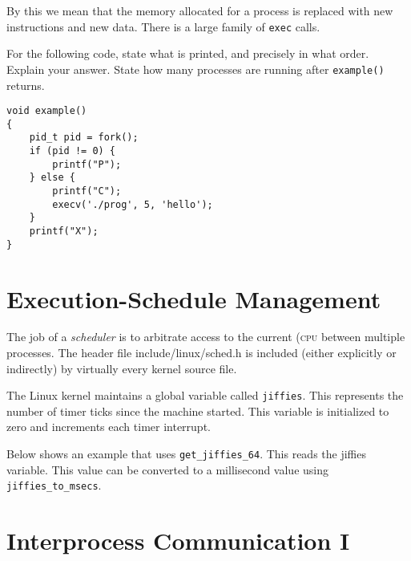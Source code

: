By this we mean that the memory allocated for a process is replaced with new 
instructions and new data. There is a large family of \lstinline{exec} calls.

\frmrule

\begin{example}
For the following code, state what is printed, and precisely in what order.
Explain your answer. State how many processes are running 
after \lstinline{example()} returns.

\begin{lstlisting}
void example()
{
	pid_t pid = fork();
	if (pid != 0) {
		printf("P");
	} else {
		printf("C");
		execv('./prog', 5, 'hello');
	}       
	printf("X");
}
\end{lstlisting}
\end{example}



\section{Execution-Schedule Management}

The job of a \textit{scheduler} is to arbitrate access to the 
current (\textsc{cpu} between multiple processes.
The header file include/linux/sched.h is included (either explicitly or indirectly) by
virtually every kernel source file.

The Linux kernel maintains a global variable called \lstinline{jiffies}. 
This represents the number of timer ticks since the machine started. 
This variable is initialized to zero and increments each timer interrupt.

Below shows an example that uses \lstinline{get_jiffies_64}. This reads the jiffies 
variable. This value can be converted to a millisecond value using 
\lstinline{jiffies_to_msecs}.







\section{Interprocess Communication I}



